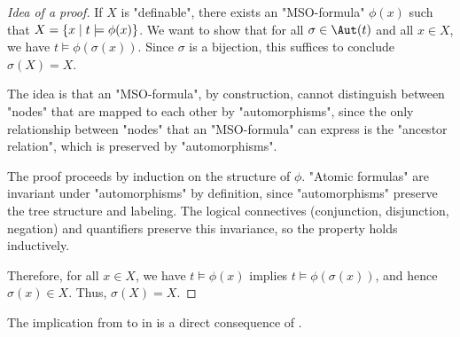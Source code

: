 \documentclass[a4paper,UKenglish,cleveref, autoref, thm-restate]{lipics-v2021}
\begin{document}
\begin{proof}[Idea of a proof]
	If $X$ is "definable", there exists an "MSO-formula" $\phi(x)$ such that $X = \left\{x \mid t \models \phi(x)\right\}$.
	We want to show that for all $\sigma \in \Aut(t)$ and all $x \in X$, we have $t \models \phi(\sigma(x))$.
	Since $\sigma$ is a bijection, this suffices to conclude $\sigma(X) = X$.

	The idea is that an "MSO-formula", by construction, cannot distinguish between "nodes" that are mapped to each other by "automorphisms", since
	the only relationship between "nodes" that an "MSO-formula" can express is the "ancestor relation", which is preserved by "automorphisms".

	The proof proceeds by induction on the structure of $\phi$. "Atomic formulas" are invariant under "automorphisms" by definition,
	since "automorphisms" preserve the tree structure and labeling. The logical connectives (conjunction, disjunction, negation)
	and quantifiers preserve this invariance, so the property holds inductively.

	Therefore, for all $x \in X$, we have $t \models \phi(x)$ implies $t \models \phi(\sigma(x))$, and hence $\sigma(x) \in X$. Thus, $\sigma(X) = X$.
\end{proof}

The implication from  to  in  is a direct consequence of .
\end{document}
